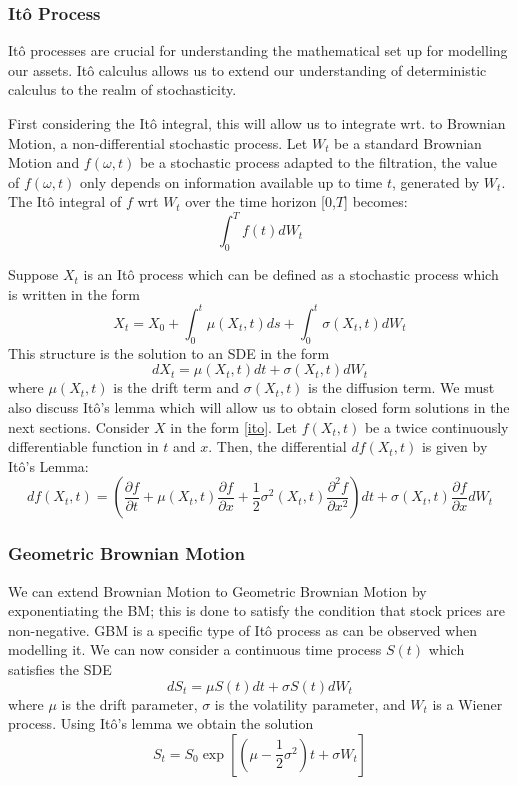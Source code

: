 \documentclass[12pt]{article}
\newcommand{\newp}
    {
    \vskip 0.5cm 
  }
\numberwithin{equation}{section}
\begin{document}
\subsubsection{It\^{o} Process}
It\^{o} processes are crucial for understanding the mathematical set up for 
modelling our assets. It\^{o} calculus allows us to extend our understanding of 
deterministic calculus to the realm of stochasticity.
\newp 
First considering the It\^{o} integral, this will allow us to integrate wrt. 
to Brownian Motion, a non-differential stochastic process. Let $W_t$ be a 
standard Brownian Motion and $f(\omega,t)$ be a stochastic process adapted to the 
filtration, the value of $f(\omega,t)$ only depends on information available 
up to time $t$, generated by $W_t$. The It\^{o} integral of $f$ wrt $W_t$ over 
the time horizon [0,$T$] becomes: 
\begin{equation}
\int_0^T f(t) dW_t
\end{equation}

Suppose $X_t$ is an It\^{o} process which can be 
defined as a stochastic process which is written in the form 
\begin{equation}
  X_t = X_0 + \int^t_0 \mu(X_t,t) ds + \int^t_0 \sigma(X_t,t) dW_t
\end{equation}
This structure is the solution to an SDE in the form 
\begin{equation}\label{ito}
  dX_t = \mu(X_t,t)dt + \sigma(X_t,t)dW_t
\end{equation}
where $\mu(X_t,t)$ is the drift term and $\sigma(X_t,t)$ is the diffusion term.
We must also discuss It\^{o}'s lemma which will allow us to obtain closed 
form solutions in the next sections. Consider $X$ in the form \ref{ito}. 
Let $f(X_t,t)$ be a twice continuously differentiable function in $t$ and $x$. 
Then, the differential $df(X_t,t)$ is given by It\^{o}'s Lemma:
\begin{equation}
  df(X_t,t) = \left( \frac{\partial f}{\partial t} + \mu(X_t,t) \frac{\partial f}
  {\partial x} + \frac{1}{2} \sigma^2(X_t,t) \frac{\partial^2 f}{\partial x^2} \right) 
  dt + \sigma(X_t,t) \frac{\partial f}{\partial x}dW_t

\end{equation}


\subsubsection{Geometric Brownian Motion}
We can extend Brownian Motion to Geometric Brownian Motion by exponentiating the BM; 
this is done to satisfy the condition that stock prices are non-negative. GBM 
is a specific type of It\^{o} process as can be observed when modelling it.
We can now consider a continuous time process $S(t)$ which satisfies the SDE
\begin{equation}
  dS_t = \mu S(t)dt + \sigma S(t)dW_t 
\end{equation}
where $\mu$ is the drift parameter, $\sigma$ is the volatility parameter, and 
$W_t$ is a Wiener process. Using It\^{o}'s lemma we obtain the solution
\begin{equation}
  S_t = S_0 \exp \left[(\mu-\frac{1}{2}\sigma^2) t + \sigma W_t\right]
\end{equation}
\end{document}
